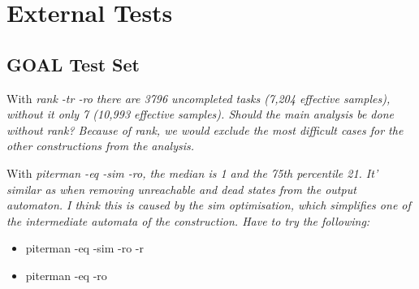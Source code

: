 



\section{External Tests}

\subsection{GOAL Test Set}

With \em{rank -tr -ro} there are 3796 uncompleted tasks (7,204 effective samples), without it only 7 (10,993 effective samples). Should the main analysis be done without rank? Because of rank, we would exclude the most difficult cases for the other constructions from the analysis.

With \em{piterman -eq -sim -ro}, the median is 1 and the 75th percentile 21. It' similar as when removing unreachable and dead states from the output automaton. I think this is caused by the sim optimisation, which simplifies one of the intermediate automata of the construction. Have to try the following:

\begin{itemize}
\item piterman -eq -sim -ro -r
\item piterman -eq -ro
\end{itemize}
